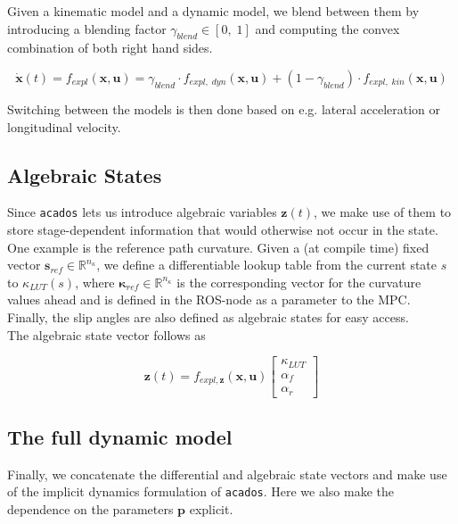 \documentclass[
a4paper, %
10pt, %
notitlepage,
english]{CSUniSchoolLabReport}
\newcommand{\acados}{\texttt{acados}}
\begin{document}
Given a kinematic model and a dynamic model, we blend between them by introducing a blending factor $\gamma_{blend}\in\left[0,\;1\right]$ and computing the convex combination of both right hand sides.

\begin{equation}
	\dot{\mathbf{x}}(t) = f_{expl}(\mathbf{x}, \mathbf{u}) = \gamma_{blend} \cdot f_{expl,\;dyn}(\mathbf{x}, \mathbf{u}) + (1 - \gamma_{blend}) \cdot f_{expl,\;kin}(\mathbf{x}, \mathbf{u})
\end{equation}

Switching between the models is then done based on e.g. lateral acceleration or longitudinal velocity.

\subsection{Algebraic States}

Since \acados{} lets us introduce algebraic variables $\mathbf{z}(t)$, we make use of them to store stage-dependent information that would otherwise not occur in the state. One example is the reference path curvature. Given a (at compile time) fixed vector $\mathbf{s}_{ref} \in \mathbb{R}^{n_{\kappa}}$, we define a differentiable lookup table from the current state $s$ to $\kappa_{LUT}(s)$, where $\mathbf{\kappa}_{ref}\in \mathbb{R}^{n_{\kappa}}$ is the corresponding vector for the curvature values ahead and is defined in the ROS-node as a parameter to the MPC.\\
Finally, the slip angles are also defined as algebraic states for easy access.\\
The algebraic state vector follows as

\begin{equation}
	\mathbf{z}(t) = f_{expl, \mathbf{z}}(\mathbf{x}, \mathbf{u})
	\left[\begin{array}{c}
		\kappa_{LUT} \\
		\alpha_f \\
		\alpha_r
	\end{array}\right]
\end{equation}

\subsection{The full dynamic model}

Finally, we concatenate the differential and algebraic state vectors and make use of the implicit dynamics formulation of \acados{}. Here we also make the dependence on the parameters $\mathbf{p}$ explicit.
\end{document}
